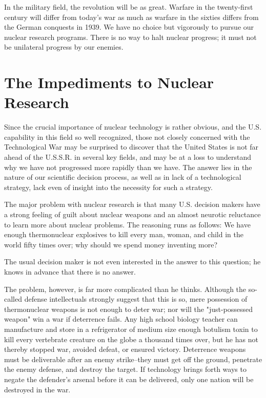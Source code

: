 In the military field, the revolution will be as great. Warfare in the twenty-first century will differ from today's war as much as warfare in the sixties differs from the German conquests in 1939. We have no choice but vigorously to pursue our nuclear research programs. There is no way to halt nuclear progress; it must not be unilateral progress by our enemies.

\section{The Impediments to Nuclear Research}
Since the crucial importance of nuclear technology is rather obvious, and the U.S. capability in this field so well recognized, those not closely concerned with the Technological War may be surprised to discover that the United States is not far ahead of the U.S.S.R. in several key fields, and may be at a loss to understand why we have not progressed more rapidly than we have. The answer lies in the nature of our scientific decision process, as well as in lack of a technological strategy, lack even of insight into the necessity for such a strategy.

The major problem with nuclear research is that many U.S. decision makers have a strong feeling of guilt about nuclear weapons and an almost neurotic reluctance to learn more about nuclear problems. The reasoning runs as follows: We have enough thermonuclear explosives to kill every man, woman, and child in the world fifty times over; why should we spend money inventing more?

The usual decision maker is not even interested in the answer to this question; he knows in advance that there is no answer.

The problem, however, is far more complicated than he thinks. Although the so-called defense intellectuals strongly suggest that this is so, mere possession of thermonuclear weapons is not enough to deter war; nor will the "just-possessed weapon" win a war if deterrence fails. Any high school biology teacher can manufacture and store in a refrigerator of medium size enough botulism toxin to kill every vertebrate creature on the globe a thousand times over, but he has not thereby stopped war, avoided defeat, or ensured victory. Deterrence weapons must be deliverable after an enemy strike--they must get off the ground, penetrate the enemy defense, and destroy the target. If technology brings forth ways to negate the defender's arsenal before it can be delivered, only one nation will be destroyed in the war.

